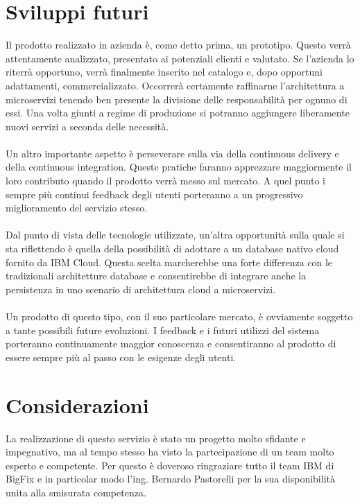 \section{Sviluppi futuri}
Il prodotto realizzato in azienda è, come detto prima, un prototipo. Questo verrà attentamente analizzato, presentato ai potenziali clienti e valutato. Se l'azienda lo riterrà opportuno, verrà finalmente inserito nel catalogo e, dopo opportuni adattamenti, commercializzato. Occorrerà certamente raffinarne l'architettura a microservizi tenendo ben presente la divisione delle responsabilità per ognuno di essi. Una volta giunti a regime di produzione si potranno aggiungere liberamente nuovi servizi a seconda delle necessità.
\paragraph{}
Un altro importante aspetto è perseverare sulla via della continuous delivery e della continuous integration. Queste pratiche faranno apprezzare maggiormente il loro contributo quando il prodotto verrà messo sul mercato. A quel punto i sempre più continui feedback degli utenti porteranno a un progressivo miglioramento del servizio stesso.
\paragraph{}
Dal punto di vista delle tecnologie utilizzate, un'altra opportunità sulla quale si sta riflettendo è quella della possibilità di adottare a un database nativo cloud fornito da IBM Cloud. Questa scelta marcherebbe una forte differenza con le tradizionali architetture database e consentirebbe di integrare anche la persistenza in uno scenario di architettura cloud a microservizi.
\paragraph{}
Un prodotto di questo tipo, con il suo particolare mercato, è ovviamente soggetto a tante possibili future evoluzioni. I feedback e i futuri utilizzi del sistema porteranno continuamente maggior conoscenza e consentiranno al prodotto di essere sempre più al passo con le esigenze degli utenti.

\section{Considerazioni}
La realizzazione di questo servizio è stato un progetto molto sfidante e impegnativo, ma al tempo stesso ha visto la partecipazione di un team molto esperto e competente. Per questo è doveroso ringraziare tutto il team IBM di BigFix e in particolar modo l'ing. Bernardo Pastorelli per la sua disponibilità unita alla smisurata competenza. 
